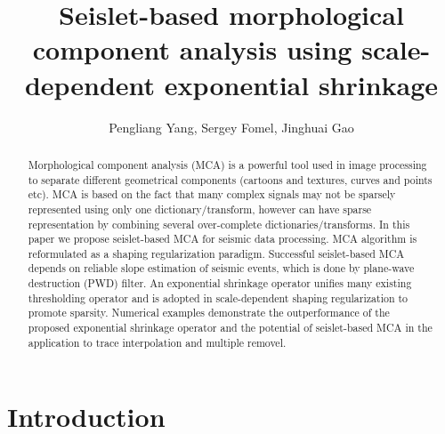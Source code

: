 \title{Seislet-based morphological component analysis using scale-dependent exponential shrinkage}

\renewcommand{\thefootnote}{\fnsymbol{footnote}}

\author{Pengliang Yang\footnotemark[1], Sergey Fomel\footnotemark[2], Jinghuai Gao\footnotemark[1]}

\address{
\footnotemark[1] Xi'an Jiaotong University\\
National Engineering Laboratory for Offshore Oil Exploration\\
Xi'an, China, 710049\\
\footnotemark[2] Bureau of Economic Geology,\\
John A. and Katherine G. Jackson School of Geosciences \\
The University of Texas at Austin \\
University Station, Box X \\
Austin, TX, USA, 78713-8924}



\maketitle

\begin{abstract}
Morphological component analysis (MCA) is a powerful tool used in image processing to separate different geometrical components (cartoons and textures, curves and points etc). MCA is based on the fact that many complex signals may not be sparsely represented using only one dictionary/transform, however can have sparse representation by combining several over-complete dictionaries/transforms. In this paper we propose seislet-based MCA for seismic data processing. MCA algorithm is reformulated as a shaping regularization paradigm. Successful seislet-based MCA depends on reliable slope estimation of seismic events, which is done by plane-wave destruction (PWD) filter. An exponential shrinkage operator unifies many existing thresholding operator and is adopted in scale-dependent shaping regularization to promote sparsity. Numerical examples demonstrate the outperformance of the proposed exponential shrinkage operator and the potential of seislet-based MCA in the application to trace interpolation and multiple removel.
\end{abstract}


\section{Introduction}

